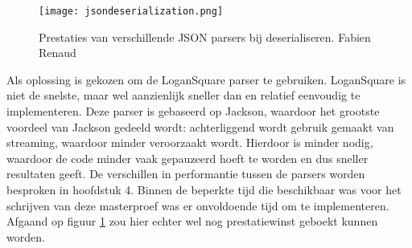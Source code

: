 \begin{figure}[h]
	\centering
	\texttt{[image: jsondeserialization.png]}
	\caption[Prestaties van JSON parsers]{Prestaties van verschillende JSON parsers bij deserialiseren.  Fabien Renaud}
	\label{fig:jsonparsersdeserialize}
\end{figure}

Als oplossing is gekozen om de LoganSquare parser te gebruiken. LoganSquare is niet de snelste, maar wel aanzienlijk sneller dan  en relatief eenvoudig te implementeren. Deze parser is gebaseerd op Jackson, waardoor het grootste voordeel van Jackson gedeeld wordt: achterliggend wordt gebruik gemaakt van streaming, waardoor minder  veroorzaakt wordt. Hierdoor is minder  nodig, waardoor de code minder vaak gepauzeerd hoeft te worden en dus sneller resultaten geeft. De verschillen in performantie tussen de parsers worden besproken in hoofdstuk 4. Binnen de beperkte tijd die beschikbaar was voor het schrijven van deze masterproef was er onvoldoende tijd om  te implementeren. Afgaand op figuur \ref{fig:jsonparsersdeserialize} zou hier echter wel nog prestatiewinst geboekt kunnen worden.